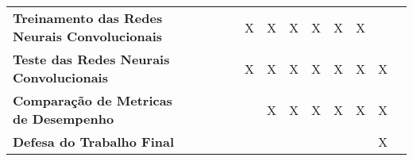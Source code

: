 \begin{table}
\begin{center}
\begin{small}
\begin{tabular}{p{5cm}cccccccccccc}
  \textbf{Treinamento das
  Redes Neurais Convolucionais}         &             &             &             &             &      X      &      X      &      X      &      X      &      X      &      X       &            \\
  \textbf{Teste das Redes
  Neurais Convolucionais}               &             &             &             &             &      X      &      X      &      X      &      X      &      X      &      X       &     X      \\
  \textbf{Comparação de Metricas
  de Desempenho}                        &             &             &             &             &             &      X      &      X      &      X      &      X      &      X      &      X      \\
  \textbf{Defesa do Trabalho Final}     &             &             &             &             &             &             &             &             &             &             &      X      \\
  \bottomrule
\end{tabular}
\end{small}
\end{center}
\end{table}
